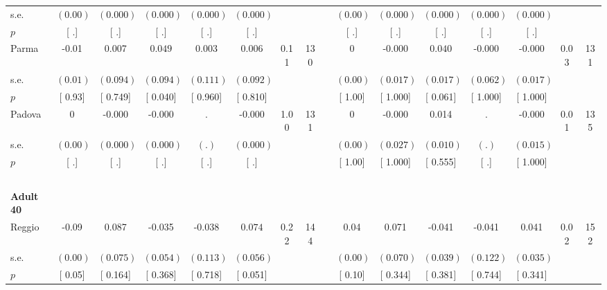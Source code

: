 \begin{longtable}{L{8em} c c c c c c c p{1em} c c c c c c c}
\quad \quad \quad \quad s.e.& $ (     0.00)$ & $ (    0.000)$ & $ (    0.000)$ & $ (    0.000)$ & $ (    0.000)$ & & & & $ (     0.00)$ & $ (    0.000)$ & $ (    0.000)$ & $ (    0.000)$ & $ (    0.000)$ & &  \\*
\quad \quad \quad \quad $ p$ & [        .] & [        .] & [        .] & [        .] & [        .] & & & & [        .] & [        .] & [        .] & [        .] & [        .] & &  \\[1em]
\quad \quad \quad Parma& -0.01 &     0.007 & $ \mathbf{    0.049}$ &     0.003 &     0.006 &      0.11 &       130 & & 0 &    -0.000 & $ \mathbf{    0.040}$ &    -0.000 &    -0.000 &      0.03 &       131  \\*
\quad \quad \quad \quad s.e.& $ (     0.01)$ & $ (    0.094)$ & $ (    0.094)$ & $ (    0.111)$ & $ (    0.092)$ & & & & $ (     0.00)$ & $ (    0.017)$ & $ (    0.017)$ & $ (    0.062)$ & $ (    0.017)$ & &  \\*
\quad \quad \quad \quad $ p$ & [     0.93] & [    0.749] & [    0.040] & [    0.960] & [    0.810] & & & & [     1.00] & [    1.000] & [    0.061] & [    1.000] & [    1.000] & &  \\[1em]
\quad \quad \quad Padova& 0 &    -0.000 &    -0.000 &         . &    -0.000 &      1.00 &       131 & & 0 &    -0.000 &     0.014 &         . &    -0.000 &      0.01 &       135  \\*
\quad \quad \quad \quad s.e.& $ (     0.00)$ & $ (    0.000)$ & $ (    0.000)$ & $ (        .)$ & $ (    0.000)$ & & & & $ (     0.00)$ & $ (    0.027)$ & $ (    0.010)$ & $ (        .)$ & $ (    0.015)$ & &  \\*
\quad \quad \quad \quad $ p$ & [        .] & [        .] & [        .] & [        .] & [        .] & & & & [     1.00] & [    1.000] & [    0.555] & [        .] & [    1.000] & &  \\[1em]
~\\[1em]
\quad \quad \textbf{Adult 40} & & & & & & & & & & & & & & & \\* 
\quad \quad \quad Reggio& -0.09 &     0.087 &    -0.035 &    -0.038 & $ \mathbf{    0.074}$ &      0.22 &       144 & & 0.04 &     0.071 &    -0.041 &    -0.041 &     0.041 &      0.02 &       152  \\*
\quad \quad \quad \quad s.e.& $ (     0.00)$ & $ (    0.075)$ & $ (    0.054)$ & $ (    0.113)$ & $ (    0.056)$ & & & & $ (     0.00)$ & $ (    0.070)$ & $ (    0.039)$ & $ (    0.122)$ & $ (    0.035)$ & &  \\*
\quad \quad \quad \quad $ p$ & [     0.05] & [    0.164] & [    0.368] & [    0.718] & [    0.051] & & & & [     0.10] & [    0.344] & [    0.381] & [    0.744] & [    0.341] & &  \\[1em]

\end{longtable}
